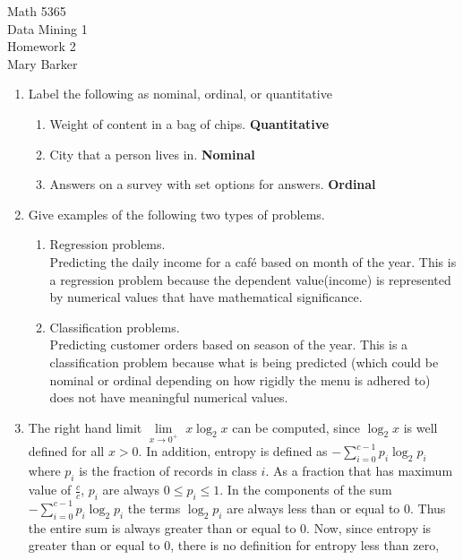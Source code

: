 \documentclass[11pt]{article}
\begin{document}
\noindent\large{Math 5365}\\
\large{Data Mining 1}\\
\large{Homework 2}\\
\large{Mary Barker}
\newline

\begin{enumerate}
  \item Label the following as nominal, ordinal, or quantitative
    \begin{enumerate}
      \item Weight of content in a bag of chips. \textbf{Quantitative}
      \item City that a person lives in. \textbf{Nominal}
      \item Answers on a survey with set options for answers. \textbf{Ordinal}
    \end{enumerate}
  \item Give examples of the following two types of problems. 
    \begin{enumerate}
      \item Regression problems. \\
          Predicting the daily income for a caf\'{e} based on month of the year. 
          This is a regression problem because the dependent value(income) is 
          represented by numerical values that have mathematical significance. 
      \item Classification problems. \\
          Predicting customer orders based on season of the year. 
          This is a classification problem because what is being predicted 
          (which could be nominal or ordinal depending on how rigidly the 
          menu is adhered to) does not have meaningful numerical values. 
    \end{enumerate}
  \item The right hand limit $\lim \limits_{x \to 0^+}$ $x \log_2 x$ can be computed, since $\log_2 x$ is well defined for all $x > 0$. 
    In addition, entropy is defined as $- \sum \limits_{i = 0}^{c - 1} p_i \log_2 p_i$ where $p_i$ is the fraction of records 
    in class $i$. As a fraction that has maximum value of $\frac{c}{c}$, $p_i$ are always $0 \le p_i \le 1$. 
    In the components of the sum $- \sum \limits_{i = 0}^{c - 1} p_i \log_2 p_i$ the terms $\log_2 p_i$ are always less than or equal to 0. 
    Thus the entire sum is always greater than or equal to 0. 
    Now, since entropy is greater than or equal to 0, there is no definition for entropy less than zero, 

\end{enumerate}
\end{document}
